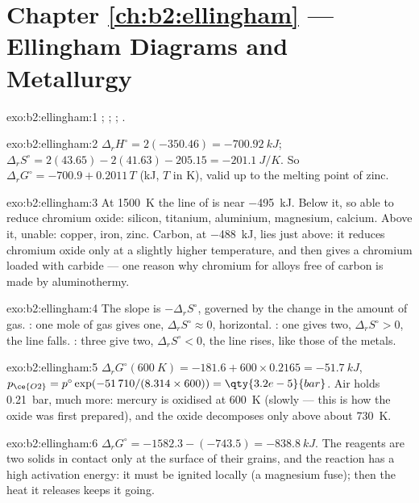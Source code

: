 \section*{Chapter \ref{ch:b2:ellingham} --- Ellingham Diagrams and Metallurgy}

\begin{solution}{exo:b2:ellingham:1}
; ; ;
.
\end{solution}

\begin{solution}{exo:b2:ellingham:2}
$\Delta_r H^\circ = 2(-350.46) = \qty{-700.92}{kJ}$; $\Delta_r S^\circ = 2(43.65)
- 2(41.63) - 205.15 = \qty{-201.1}{J/K}$. So $\Delta_r G^\circ = -700.9 +
0.2011\,T$ (\unit{kJ}, $T$ in \unit{K}), valid up to the melting point of zinc.
\end{solution}

\begin{solution}{exo:b2:ellingham:3}
At \qty{1500}{K} the line of  is near \qty{-495}{kJ}. Below it, so
able to reduce chromium oxide: silicon, titanium, aluminium, magnesium,
calcium. Above it, unable: copper, iron, zinc. Carbon, at \qty{-488}{kJ}, lies
just above: it reduces chromium oxide only at a slightly higher temperature,
and then gives a chromium loaded with carbide --- one reason why chromium for
alloys free of carbon is made by aluminothermy.
\end{solution}

\begin{solution}{exo:b2:ellingham:4}
The slope is $-\Delta_r S^\circ$, governed by the change in the amount of gas.
: one mole of gas gives one, $\Delta_r S^\circ \approx 0$,
horizontal. : one gives two, $\Delta_r S^\circ > 0$, the
line falls. : three give two, $\Delta_r S^\circ < 0$, the
line rises, like those of the metals.
\end{solution}

\begin{solution}{exo:b2:ellingham:5}
$\Delta_r G^\circ(\qty{600}{K}) = -181.6 + 600 \times 0.2165 = \qty{-51.7}{kJ}$,
$p_{\ce{O2}} = p^\circ\exp(-51\,710/(8.314 \times 600)) = \qty{3.2e-5}{bar}$. Air
holds \qty{0.21}{bar}, much more: mercury is oxidised at \qty{600}{K} (slowly
--- this is how the oxide was first prepared), and the oxide decomposes only
above about \qty{730}{K}.
\end{solution}

\begin{solution}{exo:b2:ellingham:6}
$\Delta_r G^\circ = -1582.3 - (-743.5) = \qty{-838.8}{kJ}$. The reagents are
two solids in contact only at the surface of their grains, and the reaction
has a high activation energy: it must be ignited locally (a magnesium fuse);
then the heat it releases keeps it going.
\end{solution}

